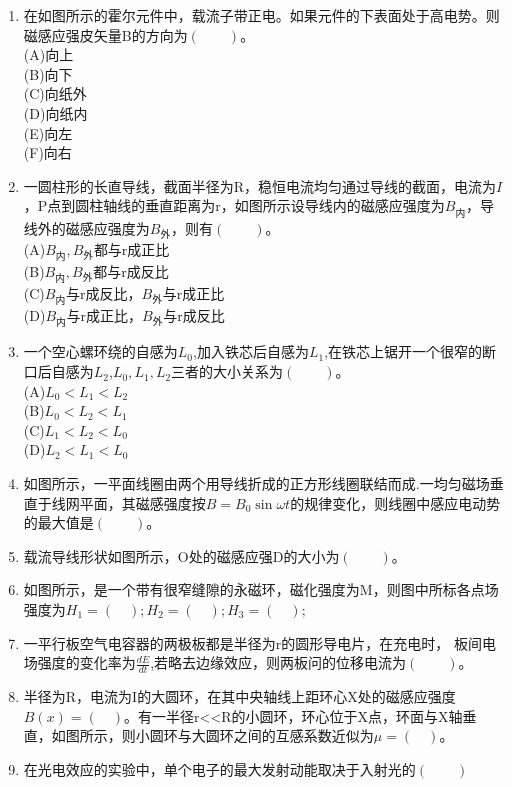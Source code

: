 \begin{enumerate}
(A)电流B顺时针,电流C顺时针
(B)电流B逆时针，电流C顺时针
(C)电流B顺时针，电流C逆时针
(D)电流B逆时针，电流C逆时针
(E)B和C中无电流
\item 在如图所示的霍尔元件中，载流子带正电。如果元件的下表面处于高电势。则磁感应强皮矢量B的方向为$(\qquad)$。\\
(A)向上\\
(B)向下\\
(C)向纸外\\
(D)向纸内\\
(E)向左\\
(F)向右
\item 一圆柱形的长直导线，截面半径为R，稳恒电流均匀通过导线的截面，电流为$I$，P点到圆柱轴线的垂直距离为r，如图所示设导线内的磁感应强度为$B_\text{内}$，导线外的磁感应强度为$B_\text{外}$，则有$(\qquad)$。\\
(A)$B_\text{内},B_\text{外}$都与r成正比\\
(B)$B_\text{内},B_\text{外}$都与r成反比\\
(C)$B_\text{内}$与r成反比，$B_\text{外}$与r成正比\\
(D)$B_\text{内}$与r成正比，$B_\text{外}$与r成反比
\item 一个空心螺环绕的自感为$L_0$,加入铁芯后自感为$L_1$,在铁芯上锯开一个很窄的断口后自感为$L_2$,$L_0,L_1,L_2$三者的大小关系为$(\qquad)$。\\
(A)$L_0<L_1<L_2$\\
(B)$L_0<L_2<L_1$\\
(C)$L_1<L_2<L_0$\\
(D)$L_2<L_1<L_0$
\item 如图所示，一平面线圈由两个用导线折成的正方形线圈联结而成.一均匀磁场垂直于线网平面，其磁感强度按$B=B_0\sin \omega t$的规律变化，则线圈中感应电动势的最大值是$(\qquad)$。
\item 载流导线形状如图所示，O处的磁感应强D的大小为$(\qquad)$。
\item 如图所示，是一个带有很窄缝隙的永磁环，磁化强度为M，则图中所标各点场强度为$H_1=(\quad);H_2=(\quad);H_3=(\quad);$
\item 一平行板空气电容器的两极板都是半径为r的圆形导电片，在充电时，
板间电场强度的变化率为$\displaystyle \frac{dE}{dt}$,若略去边缘效应，则两板问的位移电流为$(\qquad)$。
\item 半径为R，电流为I的大圆环，在其中央轴线上距环心X处的磁感应强度 $B(x)=(\quad)$。有一半径r<<R的小圆环，环心位于X点，环面与X轴垂直，如图所示，则小圆环与大圆环之间的互感系数近似为$\mu=(\quad)$。
\item 在光电效应的实验中，单个电子的最大发射动能取决于入射光的$(\qquad)$\\

\end{enumerate}
